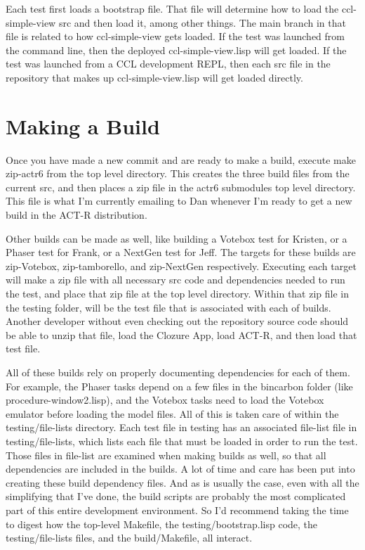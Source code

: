 \documentclass[12pt]{article} %
\begin{document}
Each test first loads a bootstrap file.
That file will determine how to load the ccl-simple-view src and then load it, among other things.
The main branch in that file is related to how ccl-simple-view gets loaded.
If the test was launched from the command line, then the deployed ccl-simple-view.lisp will get loaded.
If the test was launched from a CCL development REPL, then each src file in the repository that makes up ccl-simple-view.lisp will get loaded directly.

\section{Making a Build}

Once you have made a new commit and are ready to make a build, execute make zip-actr6 from the top level directory.
This creates the three build files from the current src, and then places a zip file in the actr6 submodules top level directory.
This file is what I'm currently emailing to Dan whenever I'm ready to get a new build in the ACT-R distribution.

Other builds can be made as well, like building a Votebox test for Kristen, or a Phaser test for Frank, or a NextGen test for Jeff.
The targets for these builds are zip-Votebox, zip-tamborello, and zip-NextGen respectively.
Executing each target will make a zip file with all necessary src code and dependencies needed to run the test, and place that zip file at the top level directory.
Within that zip file in the testing folder, will be the test file that is associated with each of builds. 
Another developer without even checking out the repository source code should be able to unzip that file, load the Clozure App, load ACT-R, and then load that test file.

All of these builds rely on properly documenting dependencies for each of them.
For example, the Phaser tasks depend on a few files in the bincarbon folder (like procedure-window2.lisp),
and the Votebox tasks need to load the Votebox emulator before loading the model files.
All of this is taken care of within the testing/file-lists directory.
Each test file in testing has an associated file-list file in testing/file-lists, which lists each file that must be loaded in order to run the test.
Those files in file-list are examined when making builds as well, so that all dependencies are included in the builds.
A lot of time and care has been put into creating these build dependency files.
And as is usually the case, even with all the simplifying that I've done, the build scripts are probably the most complicated part of this entire development environment.
So I'd recommend taking the time to digest how the top-level Makefile, the testing/bootstrap.lisp code, the testing/file-lists files, and the build/Makefile, all interact.
\end{document}
